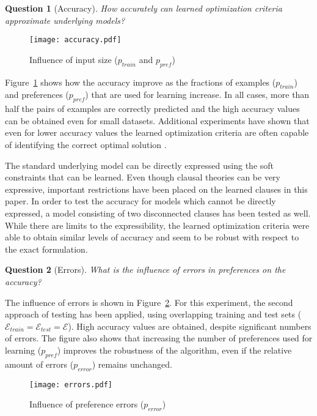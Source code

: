 \documentclass[letterpaper]{article}
\newcommand{\sym}[1]{\ensuremath{\mathcal{#1}}}
\newtheorem{question}{Question}
\theoremstyle{definition}
\begin{document}
\begin{question}[Accuracy]
  How accurately can learned optimization criteria approximate underlying models?
\end{question}

\begin{figure}
  \centering
    \texttt{[image: accuracy.pdf]}
  \caption{Influence of input size ($p_{train}$ and $p_{pref}$)}
  \label{fig:fractie}
\end{figure}

Figure~\ref{fig:fractie} shows how the accuracy improve as the fractions of examples ($p_{train}$) and preferences ($p_{pref}$) that are used for learning increase.
In all cases, more than half the pairs of examples are correctly predicted and the high accuracy values can be obtained even for small datasets.
Additional experiments have shown that even for lower accuracy values the learned optimization criteria are often capable of identifying the correct optimal solution \cite{kolb2015thesis}.

The standard underlying model can be directly expressed using the soft constraints that can be learned.
Even though clausal theories can be very expressive, important restrictions have been placed on the learned clauses in this paper.
In order to test the accuracy for models which cannot be directly expressed, a model consisting of two disconnected clauses has been tested as well.
While there are limits to the expressibility, the learned optimization criteria were able to obtain similar levels of accuracy and seem to be robust with respect to the exact formulation.

\begin{question}[Errors]
  What is the influence of errors in preferences on the accuracy?
\end{question}

The influence of errors is shown in Figure~\ref{fig:ruis}.
For this experiment, the second approach of testing has been applied, using overlapping training and test sets ($\sym{E}_{train} = \sym{E}_{test} = \sym{E}$).
High accuracy values are obtained, despite significant numbers of errors.
The figure also shows that increasing the number of preferences used for learning ($p_{pref}$) improves the robustness of the algorithm, even if the relative amount of errors ($p_{error}$) remains unchanged.

\begin{figure}
  \centering
    \texttt{[image: errors.pdf]}
  \caption{Influence of preference errors ($p_{error}$)}
  \label{fig:ruis}
\end{figure}
\end{document}
